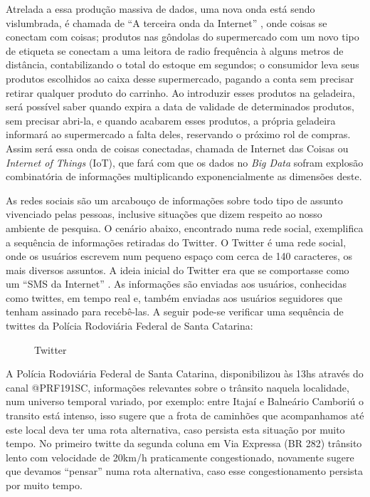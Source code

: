\documentclass[conference,compsoc]{IEEEtran}
\begin{document}
Atrelada a essa produção massiva de dados, uma nova onda está sendo vislumbrada, é chamada de ``A terceira onda da Internet''
, onde coisas se conectam com coisas; produtos nas gôndolas do supermercado com um novo tipo de etiqueta se conectam a uma 
leitora de radio frequência à alguns metros de distância, contabilizando o total do estoque em segundos; o consumidor leva 
seus produtos escolhidos ao caixa desse supermercado, pagando a conta sem precisar retirar qualquer produto do carrinho. 
Ao introduzir esses produtos na geladeira, será possível saber quando expira a data de validade de determinados produtos, sem 
precisar abri-la, e quando acabarem esses produtos, a própria geladeira informará ao supermercado a falta deles, reservando 
o próximo rol de compras. Assim será essa onda de coisas conectadas, chamada de Internet das Coisas ou \textit{Internet of Things} (IoT),
que fará com que os dados no \textit{Big Data} sofram explosão combinatória de informações multiplicando exponencialmente as dimensões deste.


As redes sociais são um arcabouço de informações sobre todo tipo de assunto vivenciado pelas pessoas, inclusive situações que dizem respeito ao nosso ambiente de pesquisa.
O cenário abaixo, encontrado numa rede social, exemplifica a sequência de informações retiradas do Twitter.
O Twitter é uma rede social, onde os usuários escrevem num pequeno espaço com cerca de 140 caracteres, os mais diversos assuntos. A ideia inicial do Twitter era que se comportasse como um ``SMS da Internet'' \cite{Twitter2015}. As informações são enviadas aos usuários, conhecidas como twittes, em tempo real e, também enviadas aos usuários seguidores que tenham assinado para recebê-las. A seguir pode-se verificar uma sequência de twittes da Polícia Rodoviária Federal de Santa Catarina:

\begin{figure}[!ht]
\caption{Twitter	}
	\quad \quad \quad \quad
	\label{fig:twitter}
\end{figure}

A Polícia Rodoviária Federal de Santa Catarina, disponibilizou às 13hs através do canal @PRF191SC, informações relevantes sobre o trânsito naquela localidade, 
num universo temporal variado, por exemplo: entre Itajaí e Balneário Camboriú o transito está intenso, isso sugere que a frota de caminhões que acompanhamos até este local deva ter uma
rota alternativa, caso persista esta situação por muito tempo. No primeiro twitte da segunda coluna em Via Expressa (BR 282) trânsito lento com 
velocidade de 20km/h praticamente congestionado, novamente sugere que devamos ``pensar'' numa rota alternativa, caso esse congestionamento persista por muito tempo.
\end{document}
